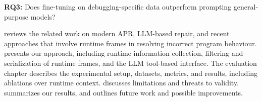 \begin{tcolorbox}[colback=orange!8!white,colframe=orange!70!black,boxrule=0.6pt,arc=2pt,left=6pt,right=6pt,top=4pt,bottom=4pt]
\textbf{RQ3:} Does fine-tuning on debugging-specific data outperform prompting general-purpose models? 
\end{tcolorbox}

 reviews the related work on modern APR, LLM-based repair, and recent approaches that involve runtime frames in resolving incorrect program behaviour.
 presents our approach, including runtime information collection, filtering and serialization of runtime frames, and the LLM tool-based interface.
The evaluation chapter describes the experimental setup, datasets, metrics, and results, including ablations over runtime context.
 discusses limitations and threats to validity.
 summarizes our results, and outlines future work and possible improvements.
